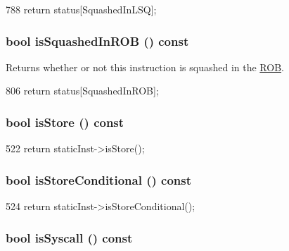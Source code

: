 \begin{DoxyCode}
788 { return status[SquashedInLSQ]; }
\end{DoxyCode}
\hypertarget{classBaseDynInst_a3409062a85a322689611ea0f77b0532e}{
\subsubsection[{isSquashedInROB}]{\setlength{\rightskip}{0pt plus 5cm}bool isSquashedInROB () const}}
\label{classBaseDynInst_a3409062a85a322689611ea0f77b0532e}
Returns whether or not this instruction is squashed in the \hyperlink{classROB}{ROB}. 


\begin{DoxyCode}
806 { return status[SquashedInROB]; }
\end{DoxyCode}
\hypertarget{classBaseDynInst_a75d02c30242181ed8a68f61087c2242d}{
\subsubsection[{isStore}]{\setlength{\rightskip}{0pt plus 5cm}bool isStore () const}}
\label{classBaseDynInst_a75d02c30242181ed8a68f61087c2242d}



\begin{DoxyCode}
522 { return staticInst->isStore(); }
\end{DoxyCode}
\hypertarget{classBaseDynInst_a7023ade89206ed967e6af7397cb744f8}{
\subsubsection[{isStoreConditional}]{\setlength{\rightskip}{0pt plus 5cm}bool isStoreConditional () const}}
\label{classBaseDynInst_a7023ade89206ed967e6af7397cb744f8}



\begin{DoxyCode}
524     { return staticInst->isStoreConditional(); }
\end{DoxyCode}
\hypertarget{classBaseDynInst_afa3ec9c6fc7c50b26c6811c3bf1bb5f0}{
\subsubsection[{isSyscall}]{\setlength{\rightskip}{0pt plus 5cm}bool isSyscall () const}}
\label{classBaseDynInst_afa3ec9c6fc7c50b26c6811c3bf1bb5f0}



